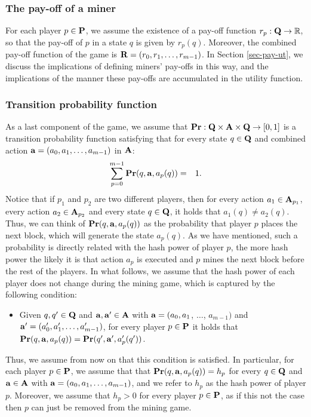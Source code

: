 \subsubsection{The pay-off of a miner}
For each player $p \in \mathbf{P}$, we assume the existence of a pay-off function $r_p : \mathbf{Q} \to \mathbb{R}$, so that the pay-off of $p$ in a state $q$ is given by $r_p(q)$. Moreover, the combined pay-off function of the game is $\mathbf{R} = (r_0, r_1, \ldots, r_{m-1})$. In Section \ref{sec-pay-ut}, we discuss the implications of defining miners' pay-offs in this way, and the implications of the manner these pay-offs are accumulated in the utility function.

\subsubsection{Transition probability function}\label{sub:transi}

As a last component of the game, we assume that $\mathbf{Pr} : \mathbf{Q} \times \mathbf{A} \times \mathbf{Q} \to [0,1]$ is a transition probability function satisfying that for every state $q \in \mathbf{Q}$ and combined action $\mathbf{a} = (a_0, a_1, \ldots, a_{m-1})$ in $\mathbf{A}$:
\begin{eqnarray*}\label{eq-prop}
\sum_{p=0}^{m-1} \mathbf{Pr}(q, \mathbf{a}, a_p(q)) & = & 1.
\end{eqnarray*}
Notice that if $p_1$ and $p_2$ are two different players, then for every action $a_1 \in \mathbf{A}_{p_1}$, every action $a_2 \in \mathbf{A}_{p_2}$ and every state $q \in \mathbf{Q}$, it holds that $a_1(q) \neq a_2(q)$. Thus, we can think of $\mathbf{Pr}(q, \mathbf{a}, a_p(q))$ as the probability that player $p$ places the next block, which will generate the state $a_p(q)$. As we have mentioned, such a probability is directly related with the hash power of player $p$, the more hash power the likely it is that action $a_p$ is executed and $p$ mines the next block before the rest of the players. In what follows, we assume that the hash power of each player does not change during the mining game, which is captured by the following condition:
\begin{itemize}
\item Given $q, q' \in \mathbf{Q}$ and $\mathbf{a}, \mathbf{a}' \in \mathbf{A}$ with $\mathbf{a} = (a_0, a_1$, $\ldots$, $a_{m-1})$ and $\mathbf{a}' = (a'_0, a'_1, \ldots, a'_{m-1})$, for every player $p \in \mathbf{P}$ it holds that $\mathbf{Pr}(q, \mathbf{a}, a_p(q)) = \mathbf{Pr}(q', \mathbf{a}', a'_p(q'))$.
\end{itemize}
Thus, we assume from now on that this condition is satisfied. In particular, for each player $p \in \mathbf{P}$, we assume that that
$\mathbf{Pr}(q, \mathbf{a}, a_p(q)) = h_p$ for every $q \in \mathbf{Q}$ and $\mathbf{a} \in \mathbf{A}$ with $\mathbf{a} = (a_0, a_1, \ldots, a_{m-1})$, and we refer to $h_p$ as the hash power of player $p$.
Moreover, we assume that $h_p > 0$ for every player $p \in \mathbf{P}$, as if this not the case then $p$ can just be removed from the mining game.


